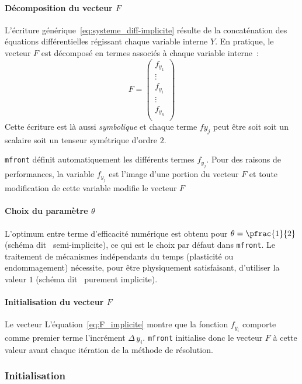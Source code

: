\documentclass[rectoverso,pleiades,pstricks,leqno,anti]{texmf/note_technique_2010}
\newcommand{\mfront}{\texttt{mfront}}
\begin{document}
\paragraph{Décomposition du vecteur $F$} L'écriture
générique~\ref{eq:systeme_diff-implicite} résulte de la concaténation
des équations différentielles régissant chaque variable interne \(Y\).
En pratique, le vecteur \(F\) est décomposé en termes associés à chaque
variable interne~:
\[
F=
\begin{pmatrix}
  f_{y_{1}} \\
  \vdots \\
  f_{y_{i}} \\
  \vdots \\
  f_{y_{n}} \\
\end{pmatrix}
\]
Cette écriture est là aussi {\em symbolique} et chaque terme
\(f{y_{j}}\) peut être soit soit un scalaire soit un tenseur symétrique
d'ordre \(2\).

\mfront{} définit automatiquement les différents termes \(f_{y_{j}}\).
Pour des raisons de performances, la variable \(f_{y_{j}}\) est l'image
d'une portion du vecteur \(F\) et toute modification de cette variable
modifie le vecteur \(F\)

\paragraph{Choix du paramètre $\theta$}
L'optimum entre terme d'efficacité numérique est obtenu pour
\(\theta=\pfrac{1}{2}\) (schéma dit \og~semi-implicite\fg{}), ce qui est
le choix par défaut dans \mfront{}. Le traitement de mécanismes
indépendants du temps (plasticité ou endommagement) nécessite, pour être
physiquement satisfaisant, d'utiliser la valeur \(1\) (schéma dit
\og~purement implicite\fg{}).

\paragraph{Initialisation du vecteur $F$} Le vecteur 
L'équation~\eqref{eq:F_implicite} montre que la fonction \(f_{y_{i}}\)
comporte comme premier terme l'incrément \(\Delta\,y_{i}\). \mfront{}
initialise donc le vecteur \(F\) à cette valeur avant chaque itération
de la méthode de résolution.

\subsubsection{Initialisation}
\end{document}
